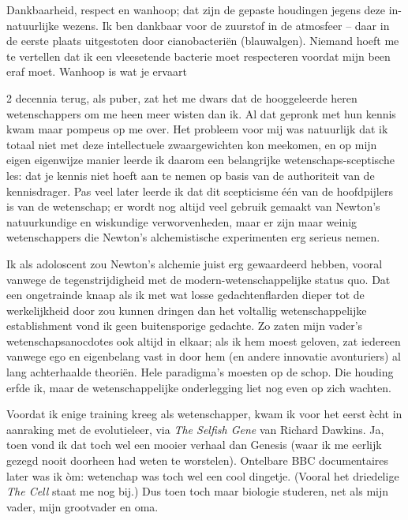 \documentclass[12pt,a4paper]{article}
\begin{document}
Dankbaarheid, respect en wanhoop; dat zijn de gepaste houdingen jegens deze in-natuurlijke wezens. Ik ben dankbaar voor de zuurstof in de atmosfeer – daar in de eerste plaats uitgestoten door cianobacteriën (blauwalgen). Niemand hoeft me te vertellen dat ik een vleesetende bacterie moet respecteren voordat mijn been eraf moet. Wanhoop is wat je ervaart 


2 decennia terug, als puber, zat het me dwars dat de hooggeleerde heren wetenschappers om me heen meer wisten dan ik. Al dat gepronk met hun kennis kwam maar pompeus op me over. Het probleem voor mij was natuurlijk dat ik totaal niet met deze intellectuele zwaargewichten kon meekomen, en op mijn eigen eigenwijze manier leerde ik daarom een belangrijke wetenschaps-sceptische les: dat je kennis niet hoeft aan te nemen op basis van de authoriteit van de kennisdrager. Pas veel later leerde ik dat dit scepticisme één van de hoofdpijlers is van de wetenschap; er wordt nog altijd veel gebruik gemaakt van Newton's natuurkundige en wiskundige verworvenheden, maar er zijn maar weinig wetenschappers die Newton's alchemistische experimenten erg serieus nemen.

Ik als adoloscent zou Newton's alchemie juist erg gewaardeerd hebben, vooral vanwege de tegenstrijdigheid met de modern-wetenschappelijke status quo. Dat een ongetrainde knaap als ik met wat losse gedachtenflarden dieper tot de werkelijkheid door zou kunnen dringen dan het voltallig wetenschappelijke establishment vond ik geen buitensporige gedachte. Zo zaten mijn vader's wetenschapsanocdotes ook altijd in elkaar; als ik hem moest geloven, zat iedereen vanwege ego en eigenbelang vast in door hem (en andere innovatie avonturiers) al lang achterhaalde theoriën. Hele paradigma's moesten op de schop. Die houding erfde ik, maar de wetenschappelijke onderlegging liet nog even op zich wachten.

Voordat ik enige training kreeg als wetenschapper, kwam ik voor het eerst ècht in aanraking met de evolutieleer, via \emph{The Selfish Gene} van Richard Dawkins. Ja, toen vond ik dat toch wel een mooier verhaal dan Genesis (waar ik me eerlijk gezegd nooit doorheen had weten te worstelen). Ontelbare BBC documentaires later was ik òm: wetenchap was toch wel een cool dingetje. (Vooral het driedelige \emph{The Cell} staat me nog bij.) Dus toen toch maar biologie studeren, net als mijn vader, mijn grootvader en oma.
\end{document}
